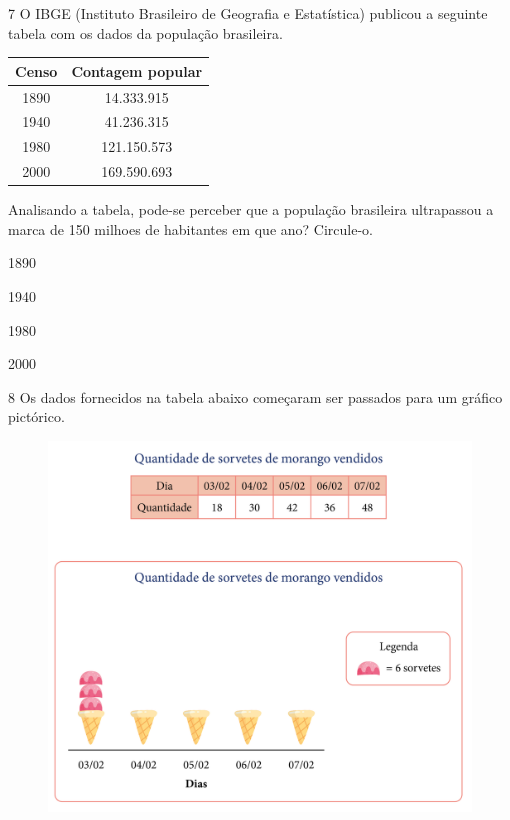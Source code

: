 \num{7} O IBGE (Instituto Brasileiro de Geografia e Estatística) publicou a
seguinte tabela com os dados da população brasileira.

\begin{center}
\begin{tabular}{c|c}
\hline
\multicolumn{1}{l|}{Censo} & \multicolumn{1}{l}{Contagem popular} \\ \hline
1890 & 14.333.915 \\ \hline
1940 & 41.236.315 \\ \hline
1980 & 121.150.573 \\ \hline
2000 & 169.590.693 \\ \hline
\end{tabular}
\end{center}

Analisando a tabela, pode-se perceber que a população brasileira
ultrapassou a marca de 150 milhoes de habitantes em que ano? Circule-o.

\begin{escolha}
\item
  1890
\item
  1940
\item
  1980
\item
  2000 
\end{escolha}


\pagebreak
\num{8} Os dados fornecidos na tabela abaixo começaram ser passados para um
gráfico pictórico.

\begin{figure}[htpb!]
\centering
\includegraphics[width=\textwidth]{../ilustracoes/MAT5/SAEB_5ANO_MAT_figura61.png}
\end{figure}

